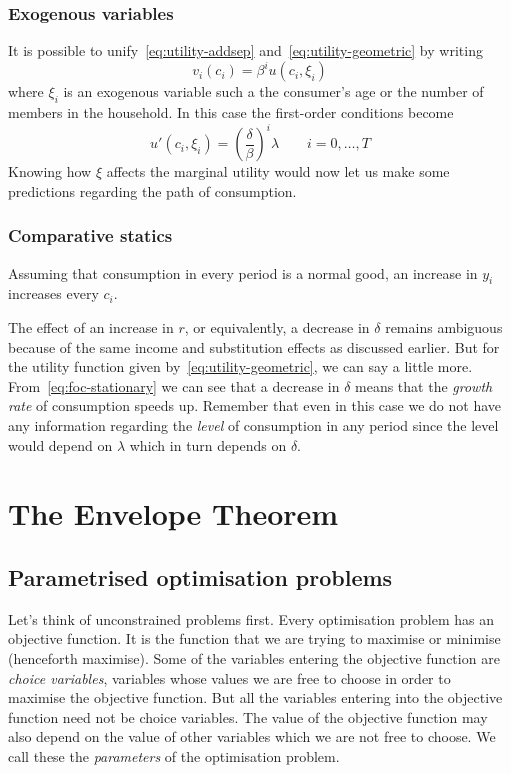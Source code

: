 \documentclass[11pt,reqno,openany]{amsbook}
\theoremstyle{plain}
\theoremstyle{definition}
\begin{document}
\subsection{Exogenous variables}
It is possible to unify~\eqref{eq:utility-addsep}
and~\eqref{eq:utility-geometric} by writing
\[v_i(c_i)=\beta^i u(c_i,\xi_i)\]
where $\xi_i$ is an exogenous variable such a the consumer's age or
the number of members in the household. In this case the first-order
conditions become
\[u'(c_i,\xi_i)=\left(\frac{\delta}{\beta}\right)^i \lambda \qquad
i=0,\ldots,T\]
Knowing how $\xi$ affects the marginal utility would
now let us make some predictions regarding the path of consumption.

\subsection{Comparative statics}
Assuming that consumption in every period is a normal good, an
increase in $y_i$ increases every $c_i$.

The effect of an increase in $r$, or equivalently, a decrease in
$\delta$ remains ambiguous because of the same income and substitution
effects as discussed earlier. But for the utility function given
by~\eqref{eq:utility-geometric}, we can say a little
more. From~\eqref{eq:foc-stationary} we can see that a decrease in
$\delta$ means that the \emph{growth rate} of consumption speeds
up. Remember that even in this case we do not have any information
regarding the \emph{level} of consumption in any period since the
level would depend on $\lambda$ which in turn depends on $\delta$.
\chapter{The Envelope Theorem}
\section{Parametrised optimisation problems}
Let's think of unconstrained problems first. Every optimisation
problem has an objective function. It is the function that we are
trying to maximise or minimise (henceforth maximise). Some of the variables entering the
objective function are \emph{choice variables}, variables whose values
we are free to choose in order to maximise the objective function. But
all the variables entering into the objective function need not be
choice variables. The value of the objective function may also depend
on the value of other variables which we are not free to choose. We
call these the \emph{parameters} of the optimisation problem. 
\end{document}
